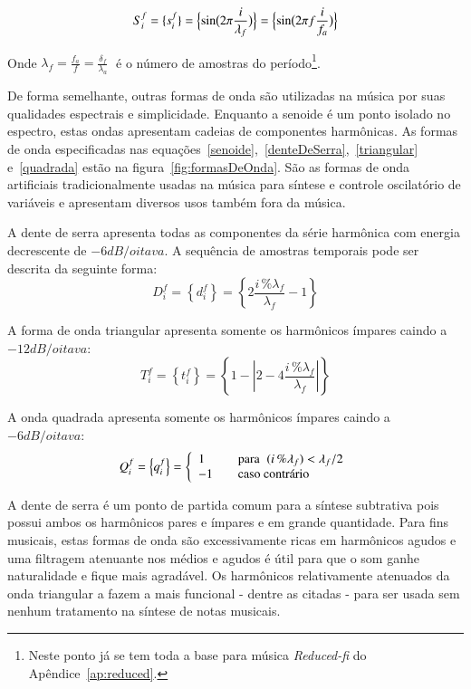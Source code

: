\begin{equation}\label{senoide}
     S^f_i=\{ s^f_i \}=\Bigl\{ \sin\bigl(2\pi \frac{i}{\lambda_f} \bigr)  \Bigr\} = \Bigl\{ \sin\bigl(2\pi f \frac{i}{f_a}\bigr)  \Bigr\} 
\end{equation}

Onde $\lambda_f=\frac{f_a}{f}=\frac{\delta_f}{\lambda_a} \;$ é o número de amostras do período\footnote{Neste ponto já se tem toda a base para música \emph{Reduced-fi} do Apêndice~\ref{ap:reduced}.}.

De forma semelhante, outras formas de onda são utilizadas na música por suas qualidades
espectrais e simplicidade. Enquanto a senoide é um ponto isolado no espectro, estas 
ondas apresentam cadeias de componentes harmônicas.
As formas de onda especificadas nas equações~\ref{senoide},~\ref{denteDeSerra},~\ref{triangular} e~\ref{quadrada} estão na figura~\ref{fig:formasDeOnda}.
São as formas de onda artificiais tradicionalmente usadas na música para síntese e controle oscilatório de variáveis e apresentam diversos usos também fora da música.\cite{Openheim}

A dente de serra apresenta todas as componentes da série
harmônica com energia decrescente de $-6dB/oitava$. A sequência de amostras temporais pode ser descrita da seguinte forma:
\begin{equation}\label{denteDeSerra}
     D^f_i=\left\{ d^f_i \right\}=\left\{ 2\frac{i\,\%\lambda_f}{\lambda_f} -1 \right\}
\end{equation}

A forma de onda triangular apresenta somente os harmônicos ímpares caindo a $-12dB/oitava$:
\begin{equation}\label{triangular}
     T^f_i=\left\{ t^f_i \right\}=\left\{1- \left| 2 - 4\frac{i\,\%\lambda_f}{\lambda_f} \right| \right\}
\end{equation}

A onda quadrada apresenta somente os harmônicos ímpares caindo a $-6dB/oitava$:
\begin{equation}\label{quadrada}
     Q^f_i=\left\{ q^f_i \right\}= \left\{
         \begin{array}{l l}
              1 & \quad \text{para} \; \; (i\,\%\lambda_f)   <  \lambda_f /2  \\
              -1 & \quad \text{caso contrário}\\
         \end{array} \right.
\end{equation}

A dente de serra é um ponto de partida comum para a síntese subtrativa pois possui
ambos os harmônicos pares e ímpares e em grande quantidade. Para fins musicais, estas formas de onda são excessivamente ricas em harmônicos agudos e uma filtragem atenuante nos médios e agudos é útil para que o som ganhe naturalidade e fique mais agradável.
Os harmônicos relativamente atenuados da onda triangular
a fazem a mais funcional - dentre as citadas - para ser usada sem nenhum tratamento na síntese de notas musicais.

